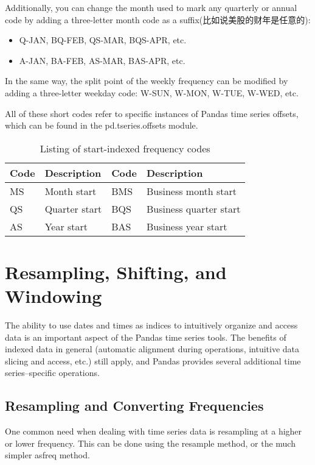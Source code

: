 Additionally, you can change the month used to mark any quarterly or annual code
by adding a three-letter month code as a suffix(比如说美股的财年是任意的):
\begin{itemize}
    \item Q-JAN, BQ-FEB, QS-MAR, BQS-APR, etc.
    \item A-JAN, BA-FEB, AS-MAR, BAS-APR, etc.
\end{itemize}

In the same way, the split point of the weekly frequency can be modified by adding a
three-letter weekday code: W-SUN, W-MON, W-TUE, W-WED, etc.

All of these short codes refer to specific instances of Pandas time series offsets, which
can be found in the pd.tseries.offsets module.

\begin{table}
    \centering
    \caption{Listing of start-indexed frequency codes}
    \label{tab23-3}
    \begin{tabular}{llll}
        \hline
        Code & Description   & Code & Description            \\
        \hline
        MS   & Month start   & BMS  & Business month start   \\
        QS   & Quarter start & BQS  & Business quarter start \\
        AS   & Year start    & BAS  & Business year start    \\
        \hline
    \end{tabular}
\end{table}

\section{Resampling, Shifting, and Windowing}
The ability to use dates and times as indices to intuitively organize and access data is
an important aspect of the Pandas time series tools. The benefits of indexed data in
general (automatic alignment during operations, intuitive data slicing and access,
etc.) still apply, and Pandas provides several additional time series–specific
operations.
\subsection*{Resampling and Converting Frequencies}
One common need when dealing with time series data is resampling at a higher or
lower frequency. This can be done using the resample method, or the much simpler
asfreq method. 

